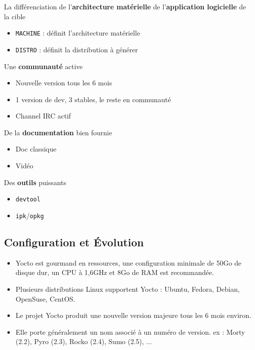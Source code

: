 \documentclass[compress]{smilebeamer}
\begin{document}
\begin{frame}
La différenciation de l’\textbf{architecture matérielle} de l’\textbf{application logicielle} de la cible
\begin{itemize}
	\item \texttt{MACHINE} : définit l’architecture matérielle
	\item \texttt{DISTRO} : définit la distribution à générer
\end{itemize}
Une \textbf{communauté} active
\begin{itemize}
	\item Nouvelle version tous les 6 mois
	\item 1 version de dev, 3 stables, le reste en communauté
	\item Channel IRC actif
\end{itemize}
De la \textbf{documentation} bien fournie
\begin{itemize}
	\item Doc classique
	\item Vidéo
\end{itemize}
Des \textbf{outils} puissants
\begin{itemize}
	\item \texttt{devtool}
	\item \texttt{ipk}/\texttt{opkg}
\end{itemize}
\end{frame}

%
%
\subsection{Configuration et Évolution}

\begin{frame}
\begin{itemize}
	\item Yocto est gourmand en ressources, une configuration minimale de 50Go de disque dur, un CPU à 1,6GHz et 8Go de RAM est recommandée.

	\item Plusieurs distributions Linux supportent Yocto : Ubuntu, Fedora, Debian, OpenSuse, CentOS.

	\item Le projet Yocto produit une nouvelle version majeure tous les 6 mois environ.

	\item Elle porte généralement un nom associé à un numéro de version.
ex : Morty (2.2), Pyro (2.3), Rocko (2.4), Sumo (2.5), ...
\end{itemize}
\end{frame}
\end{document}

